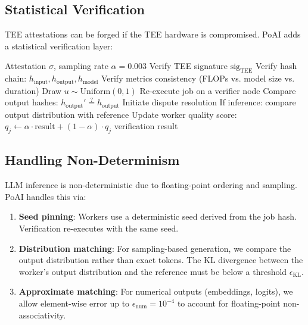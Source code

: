 \subsection{Statistical Verification}

TEE attestations can be forged if the TEE hardware is compromised. PoAI adds a statistical verification layer:

\begin{algorithm}[H]
\caption{PoAI Statistical Verification}
\label{alg:poai}
\begin{algorithmic}[1]
\Require Attestation $\sigma$, sampling rate $\alpha = 0.003$
\State {}
\State Verify TEE signature $\text{sig}_{\text{TEE}}$
\State Verify hash chain: $h_{\text{input}}, h_{\text{output}}, h_{\text{model}}$
\State Verify metrics consistency (FLOPs vs. model size vs. duration)
\State {}
\State Draw $u \sim \text{Uniform}(0, 1)$
 
    \State Re-execute job on a verifier node
    \State Compare output hashes: $h_{\text{output}}' \stackrel{?}{=} h_{\text{output}}$
        \State Initiate dispute resolution
    \EndIf
\EndIf
\State {}
\State If inference: compare output distribution with reference
\State Update worker quality score: $q_j \gets \alpha \cdot \text{result} + (1-\alpha) \cdot q_j$
\State \Return verification result
\end{algorithmic}
\end{algorithm}

\subsection{Handling Non-Determinism}

LLM inference is non-deterministic due to floating-point ordering and sampling. PoAI handles this via:

\begin{enumerate}[leftmargin=1.4em]
    \item \textbf{Seed pinning}: Workers use a deterministic seed derived from the job hash. Verification re-executes with the same seed.
    \item \textbf{Distribution matching}: For sampling-based generation, we compare the output distribution rather than exact tokens. The KL divergence between the worker's output distribution and the reference must be below a threshold $\epsilon_{\text{KL}}$.
    \item \textbf{Approximate matching}: For numerical outputs (embeddings, logits), we allow element-wise error up to $\epsilon_{\text{num}} = 10^{-4}$ to account for floating-point non-associativity.
\end{enumerate}

